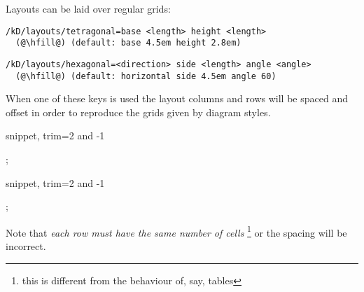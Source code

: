 Layouts can be laid over regular grids:

\begin{lstlisting}
/kD/layouts/tetragonal=base <length> height <length>
  (@\hfill@) (default: base 4.5em height 2.8em)
\end{lstlisting}

\begin{lstlisting}
/kD/layouts/hexagonal=<direction> side <length> angle <angle>
  (@\hfill@) (default: horizontal side 4.5em angle 60)
\end{lstlisting}

When one of these keys is used the layout columns and rows will be
spaced and offset in order to reproduce the grids given by diagram styles.

\begin{tcblisting}{snippet, trim={2 and -1}}
\begin{kodi}
  ;
\end{kodi}
\end{tcblisting}

\begin{tcblisting}{snippet, trim={2 and -1}}
\begin{kodi}
  ;
\end{kodi}
\end{tcblisting}

Note that \emph{each row must have the same number of cells}%
\footnote{this is different from the behaviour of, say, tables}
or the spacing will be incorrect.
